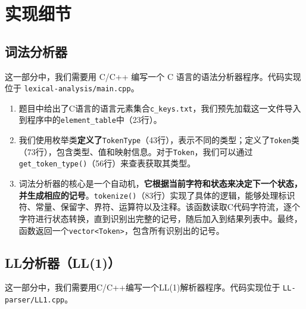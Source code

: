 \documentclass[UTF8,openany]{ctexbook}
\begin{document}
\section{实现细节}

\subsection{词法分析器}

这一部分中，我们需要用 C/C++ 编写一个 C 语言的语法分析器程序。代码实现位于 \texttt{lexical-analysis/main.cpp}。

\begin{enumerate}[noitemsep,topsep=0pt,partopsep=0pt]
    \item 题目中给出了C语言的语言元素集合\texttt{c\_keys.txt}，我们预先加载这一文件导入到程序中的\texttt{element\_table}中（23行）。
    \item 我们使用枚举类\textbf{定义了}\texttt{TokenType}（43行），表示不同的类型；定义了\texttt{Token}类（73行），包含类型、值和映射信息。对于\texttt{Token}，我们可以通过\texttt{get\_token\_type()}（56行）来查表获取其类型。
    \item 词法分析器的核心是一个自动机，\textbf{它根据当前字符和状态来决定下一个状态，并生成相应的记号}。\texttt{tokenize()}（83行）实现了具体的逻辑，能够处理标识符、常量、保留字、界符、运算符以及注释。该函数读取C代码字符流，逐个字符进行状态转换，直到识别出完整的记号，随后加入到结果列表中。最终，函数返回一个\texttt{vector<Token>}，包含所有识别出的记号。
\end{enumerate}

\subsection{LL分析器（LL(1)）}

这一部分中，我们需要用C/C++编写一个LL(1)解析器程序。代码实现位于 \texttt{LL-parser/LL1.cpp}。
\end{document}
